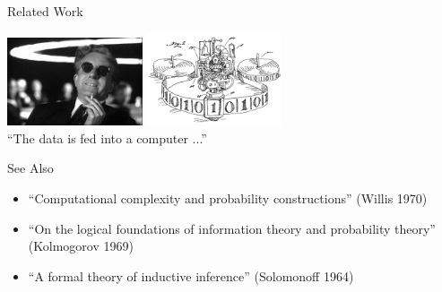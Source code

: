\documentclass{beamer}
\begin{document}
\begin{frame}{Related Work}


 \begin{center}
  \includegraphics[width=4cm]{strangelove.jpeg}
  \includegraphics[width=4cm]{turingMachine.gif}\\
  ``The data is fed into a computer ...''
 \end{center}

\begin{structure}{See Also}
 \begin{itemize}

 \item{``Computational complexity and probability constructions'' (Willis 1970)}
 \item{``On the logical foundations of information theory and probability theory'' (Kolmogorov 1969)}
 \item{``A formal theory of inductive inference'' (Solomonoff 1964)}

 \end{itemize}
\end{structure}

\end{frame}
\end{document}
